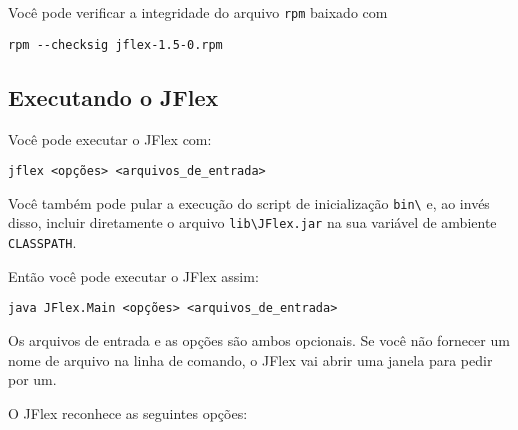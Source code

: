 \documentclass[11pt]{scrartcl}
\newcommand{\ver}{1.5}
\begin{document}
Voc\^e pode verificar a integridade do arquivo \texttt{rpm} baixado com

\verb+rpm --checksig +\texttt{jflex-\ver-0.rpm}


\subsection{Executando o JFlex}
Voc\^e pode executar o JFlex com:

\texttt{jflex <op\c{c}\~oes> <arquivos_de_entrada>}

Voc\^e tamb\'em pode pular a execu\c{c}\~ao do script de inicializa\c{c}\~ao \verb+bin\+
e, ao inv\'es disso, incluir diretamente o arquivo \verb+lib\JFlex.jar+
na sua vari\'avel de ambiente \texttt{CLASSPATH}.

Ent\~ao voc\^e pode executar o JFlex assim:

\texttt{java JFlex.Main <op\c{c}\~oes> <arquivos_de_entrada>}

Os arquivos de entrada e as op\c{c}\~oes s\~ao ambos opcionais. Se voc\^e n\~ao fornecer um nome de arquivo na linha de comando, o JFlex vai
abrir uma janela para pedir por um.

O JFlex reconhece as seguintes op\c{c}\~oes:
\end{document}
